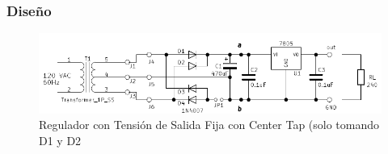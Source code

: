     \subsubsection{Diseño}
    \begin{figure}[H]
          \centering
          \setcounter{figure}{32}
          \includegraphics[width=15cm]{Imagenes/regulador_sal_fija.png}
          \caption{Regulador con Tensión de Salida Fija con Center Tap (solo tomando D1 y D2}
          \label{fig:regulador_sal_fija}
    \end{figure}

